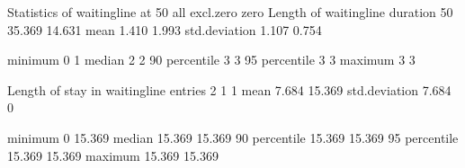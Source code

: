 \documentclass[letterpaper,10pt,english]{sphinxmanual}
\begin{document}
\begin{sphinxVerbatim}[commandchars=\\\{\}]
Statistics of waitingline at        50
                                                                     all    excl.zero         zero
\PYGZhy{}\PYGZhy{}\PYGZhy{}\PYGZhy{}\PYGZhy{}\PYGZhy{}\PYGZhy{}\PYGZhy{}\PYGZhy{}\PYGZhy{}\PYGZhy{}\PYGZhy{}\PYGZhy{}\PYGZhy{}\PYGZhy{}\PYGZhy{}\PYGZhy{}\PYGZhy{}\PYGZhy{}\PYGZhy{}\PYGZhy{}\PYGZhy{}\PYGZhy{}\PYGZhy{}\PYGZhy{}\PYGZhy{}\PYGZhy{}\PYGZhy{}\PYGZhy{}\PYGZhy{}\PYGZhy{}\PYGZhy{}\PYGZhy{}\PYGZhy{}\PYGZhy{}\PYGZhy{}\PYGZhy{}\PYGZhy{}\PYGZhy{}\PYGZhy{}\PYGZhy{}\PYGZhy{}\PYGZhy{}\PYGZhy{} \PYGZhy{}\PYGZhy{}\PYGZhy{}\PYGZhy{}\PYGZhy{}\PYGZhy{}\PYGZhy{}\PYGZhy{}\PYGZhy{}\PYGZhy{}\PYGZhy{}\PYGZhy{}\PYGZhy{}\PYGZhy{} \PYGZhy{}\PYGZhy{}\PYGZhy{}\PYGZhy{}\PYGZhy{}\PYGZhy{}\PYGZhy{}\PYGZhy{}\PYGZhy{}\PYGZhy{}\PYGZhy{}\PYGZhy{} \PYGZhy{}\PYGZhy{}\PYGZhy{}\PYGZhy{}\PYGZhy{}\PYGZhy{}\PYGZhy{}\PYGZhy{}\PYGZhy{}\PYGZhy{}\PYGZhy{}\PYGZhy{} \PYGZhy{}\PYGZhy{}\PYGZhy{}\PYGZhy{}\PYGZhy{}\PYGZhy{}\PYGZhy{}\PYGZhy{}\PYGZhy{}\PYGZhy{}\PYGZhy{}\PYGZhy{}
Length of waitingline                        duration             50           35.369       14.631
                                             mean                  1.410        1.993
                                             std.deviation         1.107        0.754

                                             minimum               0            1
                                             median                2            2
                                             90\PYGZpc{} percentile        3            3
                                             95\PYGZpc{} percentile        3            3
                                             maximum               3            3

Length of stay in waitingline                entries               2            1            1
                                             mean                  7.684       15.369
                                             std.deviation         7.684        0

                                             minimum               0           15.369
                                             median               15.369       15.369
                                             90\PYGZpc{} percentile       15.369       15.369
                                             95\PYGZpc{} percentile       15.369       15.369
                                             maximum              15.369       15.369
\end{sphinxVerbatim}
\end{document}
